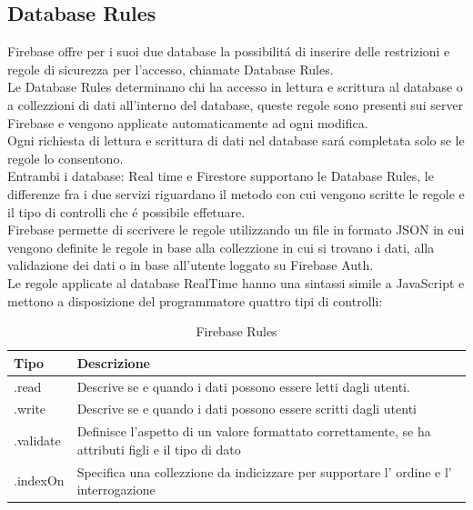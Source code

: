 \subsection{Database Rules}                 %
Firebase offre per i suoi due database la possibilit\'a di inserire delle restrizioni e regole di sicurezza per l'accesso, chiamate Database Rules.\\
Le Database Rules determinano chi ha accesso in lettura e scrittura al database o a collezzioni di dati all'interno del database, queste regole sono presenti sui server Firebase e vengono applicate automaticamente ad ogni modifica. \\
Ogni richiesta di lettura e scrittura di dati nel database sar\'a completata solo se le regole lo consentono.\\
Entrambi i database: Real time e Firestore supportano le Database Rules, le differenze fra i due servizi riguardano il metodo con cui vengono scritte le regole e il tipo di controlli che \'e possibile effetuare.\\
Firebase permette di sccrivere le regole utilizzando un file in formato JSON in cui vengono definite le regole in base alla collezzione in cui si trovano i dati, alla validazione dei dati o in base all'utente loggato su Firebase Auth.\\
Le regole applicate al database RealTime hanno una sintassi simile a JavaScript e mettono a disposizione del programmatore quattro tipi di controlli:

\begin{table}[h]
\begin{center}
\begin{tabular}{|p{2cm}|p{12cm}|}
    \hline
    {\textbf{Tipo}} & {\textbf{Descrizione}} \\ \hline
    .read & Descrive se e quando i dati possono essere letti dagli utenti.\\ \hline
   .write & Descrive se e quando i dati possono essere scritti dagli utenti\\ \hline
     .validate & Definisce l'aspetto di un valore formattato correttamente, se ha attributi figli e il tipo di dato\\ \hline
    .indexOn & Specifica una collezzione da indicizzare per supportare l' ordine e l' interrogazione\\ \hline
\end{tabular}
\caption[Firbase Rules ]{Firebase Rules}\label{tab:Firebase Rules}
\end{center}
\end{table}


